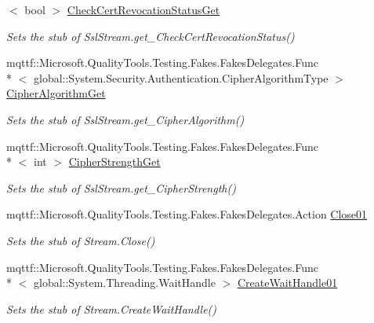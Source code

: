 \begin{DoxyCompactItemize}
$<$ bool $>$ \hyperlink{class_system_1_1_net_1_1_security_1_1_fakes_1_1_stub_ssl_stream_a61c10b5ee2fd1026a791613bcc30bffd}{Check\-Cert\-Revocation\-Status\-Get}
\begin{DoxyCompactList}\small\item\em Sets the stub of Ssl\-Stream.\-get\-\_\-\-Check\-Cert\-Revocation\-Status()\end{DoxyCompactList}\item 
mqttf\-::\-Microsoft.\-Quality\-Tools.\-Testing.\-Fakes.\-Fakes\-Delegates.\-Func\\*
$<$ global\-::\-System.\-Security.\-Authentication.\-Cipher\-Algorithm\-Type $>$ \hyperlink{class_system_1_1_net_1_1_security_1_1_fakes_1_1_stub_ssl_stream_af8839705e312cc9bde3b6e155a41764e}{Cipher\-Algorithm\-Get}
\begin{DoxyCompactList}\small\item\em Sets the stub of Ssl\-Stream.\-get\-\_\-\-Cipher\-Algorithm()\end{DoxyCompactList}\item 
mqttf\-::\-Microsoft.\-Quality\-Tools.\-Testing.\-Fakes.\-Fakes\-Delegates.\-Func\\*
$<$ int $>$ \hyperlink{class_system_1_1_net_1_1_security_1_1_fakes_1_1_stub_ssl_stream_a8a089b96f8848f9e68df0056846342a4}{Cipher\-Strength\-Get}
\begin{DoxyCompactList}\small\item\em Sets the stub of Ssl\-Stream.\-get\-\_\-\-Cipher\-Strength()\end{DoxyCompactList}\item 
mqttf\-::\-Microsoft.\-Quality\-Tools.\-Testing.\-Fakes.\-Fakes\-Delegates.\-Action \hyperlink{class_system_1_1_net_1_1_security_1_1_fakes_1_1_stub_ssl_stream_a62656660bbe8490871d18eecdb64c442}{Close01}
\begin{DoxyCompactList}\small\item\em Sets the stub of Stream.\-Close()\end{DoxyCompactList}\item 
mqttf\-::\-Microsoft.\-Quality\-Tools.\-Testing.\-Fakes.\-Fakes\-Delegates.\-Func\\*
$<$ global\-::\-System.\-Threading.\-Wait\-Handle $>$ \hyperlink{class_system_1_1_net_1_1_security_1_1_fakes_1_1_stub_ssl_stream_ae8b21c82a3cc456d53405074a9c36401}{Create\-Wait\-Handle01}
\begin{DoxyCompactList}\small\item\em Sets the stub of Stream.\-Create\-Wait\-Handle()\end{DoxyCompactList}\item 

\end{DoxyCompactItemize}
